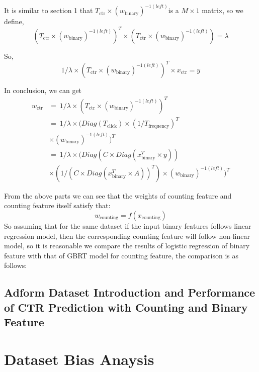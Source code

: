 \documentclass{sig-alternate}
\begin{document}
It is similar to section 1 that \(T_{\text{ctr}} \times (w_{\text{binary}})^{-1(left)}\)is a \(M \times 1\) matrix, so we define, 
\begin{equation}
(T_{\text{ctr}} \times (w_{\text{binary}})^{-1(left)})^T \times (T_{\text{ctr}} \times (w_{\text{binary}})^{-1(left)}) = \lambda
\end{equation}

So, 
\begin{equation}
1/{\lambda} \times (T_{\text{ctr}} \times (w_{\text{binary}})^{-1(left)})^T \times x_{\text{ctr}} =  y
\end{equation}

In conclusion, we can get
\begin{equation} 
\begin{split}
w_{\text{ctr}} & =\ 1/{\lambda} \times (T_{\text{ctr}} \times (w_{\text{binary}})^{-1(left)})^T \\
& = \ 1/{\lambda} \times (Diag(T_{\text{click}}) \times (1/T_{\text{frequency}} )^T \\ 
& \times (w_{\text{binary}})^{-1(left)})^T \\
& = \ 1/{\lambda} \times (Diag(C \times Diag(x_{\text{binary}}^T \times y)) \\ 
& \times (1/ (C \times Diag(x_{\text{binary}}^T \times A) )^T) \times (w_{\text{binary}})^{-1(left)})^T
\end{split}
\end{equation}


From the above parts we can see that the weights of counting feature and counting feature itself satisfy that:
\begin{equation}
w_{\text{counting}} = f(x_{\text{counting}})
\end{equation}
So assuming that for the same dataset if the input binary features follows linear regression model, then the corresponding counting feature will follow non-linear model, so it is reasonable we compare the results of logistic regression of binary feature with that of GBRT model for counting feature, the comparison is as follows:
\subsection{Adform Dataset Introduction and Performance of CTR Prediction with Counting and Binary Feature}


\section{Dataset Bias Anaysis}
\end{document}
